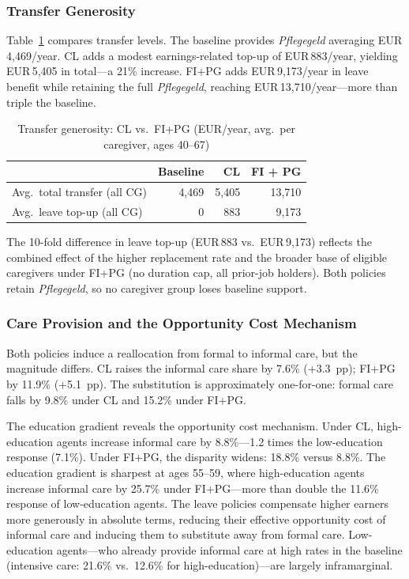 \subsubsection{Transfer Generosity}

Table~\ref{tab:main_transfers} compares transfer levels. The baseline provides \textit{Pflegegeld} averaging EUR\,4,469/year. CL adds a modest earnings-related top-up of EUR\,883/year, yielding EUR\,5,405 in total---a 21\% increase. FI+PG adds EUR\,9,173/year in leave benefit while retaining the full \textit{Pflegegeld}, reaching EUR\,13,710/year---more than triple the baseline.

\begin{table}[htbp]
  \centering
  \caption{Transfer generosity: CL vs.\ FI+PG (EUR/year, avg.\ per caregiver, ages 40--67)}
  \label{tab:main_transfers}
  \small
  \begin{tabular}{lrrr}
    \toprule
    & Baseline & CL & FI + PG \\
    \midrule
    Avg.\ total transfer (all CG) & 4,469 & 5,405 & 13,710 \\
    Avg.\ leave top-up (all CG) & 0 & 883 & 9,173 \\
    \bottomrule
  \end{tabular}
\end{table}

The 10-fold difference in leave top-up (EUR\,883 vs.\ EUR\,9,173) reflects the combined effect of the higher replacement rate and the broader base of eligible caregivers under FI+PG (no duration cap, all prior-job holders). Both policies retain \textit{Pflegegeld}, so no caregiver group loses baseline support.

\subsubsection{Care Provision and the Opportunity Cost Mechanism}

Both policies induce a reallocation from formal to informal care, but the magnitude differs. CL raises the informal care share by 7.6\% (+3.3~pp); FI+PG by 11.9\% (+5.1~pp). The substitution is approximately one-for-one: formal care falls by 9.8\% under CL and 15.2\% under FI+PG.

The education gradient reveals the opportunity cost mechanism. Under CL, high-education agents increase informal care by 8.8\%---1.2 times the low-education response (7.1\%). Under FI+PG, the disparity widens: 18.8\% versus 8.8\%. The education gradient is sharpest at ages 55--59, where high-education agents increase informal care by 25.7\% under FI+PG---more than double the 11.6\% response of low-education agents. The leave policies compensate higher earners more generously in absolute terms, reducing their effective opportunity cost of informal care and inducing them to substitute away from formal care. Low-education agents---who already provide informal care at high rates in the baseline (intensive care: 21.6\% vs.\ 12.6\% for high-education)---are largely inframarginal.

